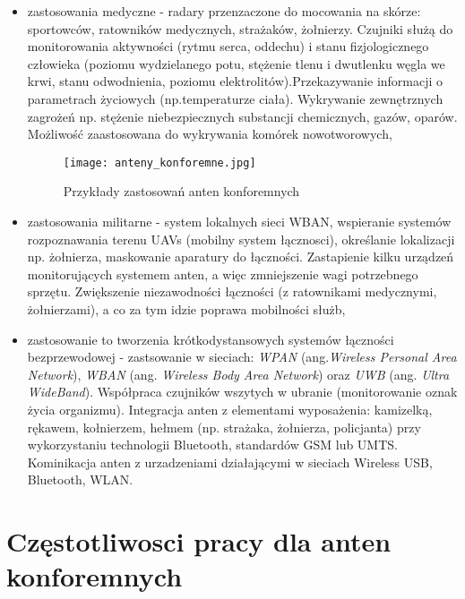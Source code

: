 \begin{itemize}\setlength{\itemsep}{0pt}
	
	\item zastosowania medyczne - radary przenzaczone do mocowania na skórze: sportowców, ratowników medycznych, strażaków, żołnierzy. Czujniki służą do monitorowania aktywności (rytmu serca, oddechu) i stanu fizjologicznego człowieka (poziomu wydzielanego potu, stężenie tlenu i dwutlenku węgla we krwi, stanu odwodnienia, poziomu elektrolitów).Przekazywanie informacji o parametrach życiowych (np.temperaturze ciała). Wykrywanie zewnętrznych zagrożeń np. stężenie niebezpiecznych substancji chemicznych, gazów, oparów. Możliwość zaastosowana do wykrywania komórek nowotworowych,  

\begin{figure}[h!]
\centering
	\texttt{[image: anteny\_konforemne.jpg]}
	\caption{Przykłady zastosowań anten konforemnych}
\end{figure}

	\item zastosowania militarne - system lokalnych sieci WBAN, wspieranie systemów rozpoznawania terenu UAVs (mobilny system łącznosci), określanie lokalizacji np. żołnierza, maskowanie aparatury do łączności.
	Zastapienie kilku urządzeń monitorujących systemem anten, a więc zmniejszenie wagi potrzebnego sprzętu. Zwiększenie niezawodności łączności (z ratownikami medycznymi, żołnierzami), a co za tym idzie poprawa mobilności służb,      

	\item zastosowanie to tworzenia krótkodystansowych systemów łączności bezprzewodowej - zastsowanie w sieciach: \emph{WPAN} (ang.\emph{Wireless Personal Area Network}), \emph{WBAN} (ang. \emph{Wireless Body Area Network}) oraz \emph{UWB} (ang. \emph{Ultra WideBand}). Współpraca czujników wszytych w ubranie (monitorowanie oznak życia organizmu). Integracja anten z elementami wyposażenia: kamizelką, rękawem, kołnierzem, hełmem (np. strażaka, żołnierza, policjanta) przy wykorzystaniu technologii Bluetooth, standardów GSM lub UMTS. Kominikacja anten z urzadzeniami działającymi w sieciach Wireless USB, Bluetooth, WLAN.  

\end{itemize}
	

\section{Częstotliwosci pracy dla anten konforemnych}
 
